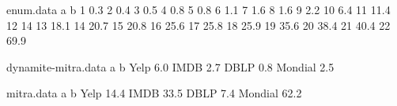 \documentclass[]{article}
\begin{document}
                    \begin{filecontents}{enum.data}
                        a    b
                        1   0.3
                        2   0.4
                        3   0.5
                        4   0.8
                        5   0.8
                        6   1.1
                        7   1.6
                        8   1.6
                        9   2.2
                        10  6.4
                        11  11.4
                        12  14
                        13  18.1
                        14  20.7
                        15  20.8
                        16  25.6
                        17  25.8
                        18  25.9
                        19  35.6
                        20  38.4
                        21  40.4
                        22  69.9
                    \end{filecontents}

                    \begin{filecontents}{dynamite-mitra.data}
                        a    b
                        Yelp    6.0
                        IMDB    2.7
                        DBLP    0.8
                        Mondial 2.5
                    \end{filecontents}

                    \begin{filecontents}{mitra.data}
                        a    b
                        Yelp    14.4
                        IMDB    33.5
                        DBLP    7.4
                        Mondial 62.2
                    \end{filecontents}
\end{document}
